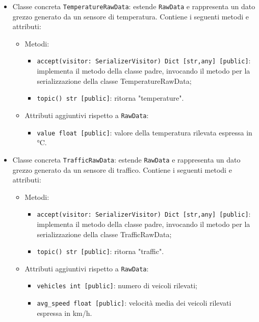 \begin{itemize}
\begin{itemize}
	      \end{itemize}
	\item Classe concreta \texttt{TemperatureRawData}: estende \texttt{RawData} e rappresenta un dato grezzo generato da un sensore di temperatura. Contiene i seguenti metodi e attributi:
	      \begin{itemize}
		      \item Metodi:
		            \begin{itemize}
			            \item \texttt{accept(visitor: SerializerVisitor) Dict [str,any] [public]}: implementa il metodo della classe padre, invocando il metodo per la serializzazione della classe TemperatureRawData;
			            \item \texttt{topic() str [public]}: ritorna "temperature".
		            \end{itemize}
		      \item Attributi aggiuntivi rispetto a \texttt{RawData}:
		            \begin{itemize}
			            \item \texttt{value float [public]}: valore della temperatura rilevata espressa in °C.
		            \end{itemize}
	      \end{itemize}
	\item Classe concreta \texttt{TrafficRawData}: estende \texttt{RawData} e rappresenta un dato grezzo generato da un sensore di traffico. Contiene i seguenti metodi e attributi:
	      \begin{itemize}
		      \item Metodi:
		            \begin{itemize}
			            \item \texttt{accept(visitor: SerializerVisitor) Dict [str,any] [public]}: implementa il metodo della classe padre, invocando il metodo per la serializzazione della classe TrafficRawData;
			            \item \texttt{topic() str [public]}: ritorna "traffic".
		            \end{itemize}
		      \item Attributi aggiuntivi rispetto a \texttt{RawData}:
		            \begin{itemize}
			            \item \texttt{vehicles int [public]}: numero di veicoli rilevati;
			            \item \texttt{avg\_speed float [public]}: velocità media dei veicoli rilevati espressa in km/h.
		            \end{itemize}
	      \end{itemize}
\end{itemize}

